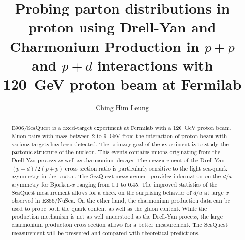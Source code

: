 \documentclass[]{uiucthesis2021}
\begin{document}
\title{Probing parton distributions in proton using Drell-Yan and Charmonium Production
	in $p+p$ and $p+d$ interactions with \SI{120}{\GeV} proton beam at Fermilab}
\author{Ching Him Leung}

\phdthesis
{}
\maketitle
\frontmatter

\begin{abstract}
	E906/SeaQuest is a fixed-target experiment at Fermilab with a \SI{120}{\GeV}
	proton beam. Muon pairs with mass between \num{2} to \SI{9}{\GeV} from the
	interaction of proton beam with various targets has been detected. The primary
	goal of the experiment is to study the partonic structure of the nucleon. This 
	events contains muons originating from the Drell-Yan process as well as 
	charmonium decays. The measurement of the Drell-Yan $(p+d)/2(p+p)$ cross section
	ratio is particularly sensitive to the light sea-quark asymmetry in the proton.
	The SeaQuest measurement provides information on the $\bar{d}/\bar{u}$ asymmetry 
	for  Bjorken-$x$ ranging from \num{0.1} to \num{0.45}. The improved statistics
	of the SeaQuest measurement allows for a check on the surprising behavior of 
	$\bar{d}/\bar{u}$ at large $x$ observed in E866/NuSea. 
	On the other hand, the charmonium production data can be used to probe both the quark
	content as well as the gluon content. While the production mechanism is not as well
	understood as the Drell-Yan process, the large charmonium production cross section
	allows for a better measurement.	
	The SeaQuest measurement will be presented and compared with theoretical predictions.


\end{abstract}


\ifoptionfinal{
	
}{}

{
	\hypersetup{linkcolor=black}  %
	\tableofcontents
	\listoffigures
}


\mainmatter












\backmatter

\printbibliography[heading=bibintoc,title={References}]
\end{document}
